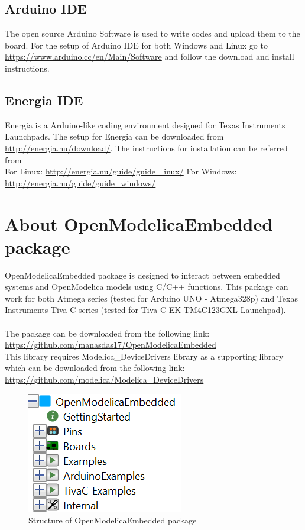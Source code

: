 \documentclass[12pt,a4paper]{report}
\begin{document}
\section{Arduino IDE}
The open source Arduino Software is used to write codes and upload them to the board. For the setup of Arduino IDE for both Windows and Linux go to \url{https://www.arduino.cc/en/Main/Software} and follow the download and install instructions.

\section{Energia IDE}
Energia is a Arduino-like coding environment designed for Texas Instruments Launchpads. The setup for Energia can be downloaded from \url{http://energia.nu/download/}. The instructions for installation can be referred from - \\
For Linux: \url{http://energia.nu/guide/guide_linux/}
For Windows: \url{http://energia.nu/guide/guide_windows/}


\chapter{\textbf{About OpenModelicaEmbedded package}}

OpenModelicaEmbedded package is designed to interact between embedded systems and OpenModelica models using C/C++ functions. This package can work for both Atmega series (tested for Arduino UNO - Atmega328p) and Texas Instruments Tiva C series (tested for Tiva C EK-TM4C123GXL Launchpad).\\
\\
The package can be downloaded from the following link:\\
\url{https://github.com/manasdas17/OpenModelicaEmbedded}\\
This library requires Modelica\_DeviceDrivers library as a supporting library which can be downloaded from the following link:\\
\url{https://github.com/modelica/Modelica_DeviceDrivers}

\begin{figure}[H]
\centering
\includegraphics[width =0.5 \textwidth]{package_str}
\caption{Structure of OpenModelicaEmbedded package}
\label{figure:1}
\end{figure}
\end{document}
